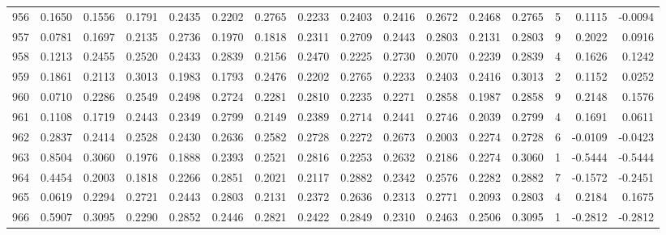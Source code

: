 \begin{tabular}{lrrrrrrrrrrrrrrr}
956 &      0.1650 &  0.1556 &  0.1791 &  0.2435 &  0.2202 &  0.2765 &  0.2233 &  0.2403 &  0.2416 &  0.2672 &   0.2468 &     0.2765 &      5 &                    0.1115 &                    -0.0094 \\
957 &      0.0781 &  0.1697 &  0.2135 &  0.2736 &  0.1970 &  0.1818 &  0.2311 &  0.2709 &  0.2443 &  0.2803 &   0.2131 &     0.2803 &      9 &                    0.2022 &                     0.0916 \\
958 &      0.1213 &  0.2455 &  0.2520 &  0.2433 &  0.2839 &  0.2156 &  0.2470 &  0.2225 &  0.2730 &  0.2070 &   0.2239 &     0.2839 &      4 &                    0.1626 &                     0.1242 \\
959 &      0.1861 &  0.2113 &  0.3013 &  0.1983 &  0.1793 &  0.2476 &  0.2202 &  0.2765 &  0.2233 &  0.2403 &   0.2416 &     0.3013 &      2 &                    0.1152 &                     0.0252 \\
960 &      0.0710 &  0.2286 &  0.2549 &  0.2498 &  0.2724 &  0.2281 &  0.2810 &  0.2235 &  0.2271 &  0.2858 &   0.1987 &     0.2858 &      9 &                    0.2148 &                     0.1576 \\
961 &      0.1108 &  0.1719 &  0.2443 &  0.2349 &  0.2799 &  0.2149 &  0.2389 &  0.2714 &  0.2441 &  0.2746 &   0.2039 &     0.2799 &      4 &                    0.1691 &                     0.0611 \\
962 &      0.2837 &  0.2414 &  0.2528 &  0.2430 &  0.2636 &  0.2582 &  0.2728 &  0.2272 &  0.2673 &  0.2003 &   0.2274 &     0.2728 &      6 &                   -0.0109 &                    -0.0423 \\
963 &      0.8504 &  0.3060 &  0.1976 &  0.1888 &  0.2393 &  0.2521 &  0.2816 &  0.2253 &  0.2632 &  0.2186 &   0.2274 &     0.3060 &      1 &                   -0.5444 &                    -0.5444 \\
964 &      0.4454 &  0.2003 &  0.1818 &  0.2266 &  0.2851 &  0.2021 &  0.2117 &  0.2882 &  0.2342 &  0.2576 &   0.2282 &     0.2882 &      7 &                   -0.1572 &                    -0.2451 \\
965 &      0.0619 &  0.2294 &  0.2721 &  0.2443 &  0.2803 &  0.2131 &  0.2372 &  0.2636 &  0.2313 &  0.2771 &   0.2093 &     0.2803 &      4 &                    0.2184 &                     0.1675 \\
966 &      0.5907 &  0.3095 &  0.2290 &  0.2852 &  0.2446 &  0.2821 &  0.2422 &  0.2849 &  0.2310 &  0.2463 &   0.2506 &     0.3095 &      1 &                   -0.2812 &                    -0.2812 \\

\end{tabular}
